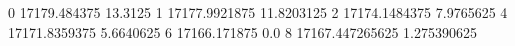 0 17179.484375 13.3125
1 17177.9921875 11.8203125
2 17174.1484375 7.9765625
4 17171.8359375 5.6640625
6 17166.171875 0.0
8 17167.447265625 1.275390625

